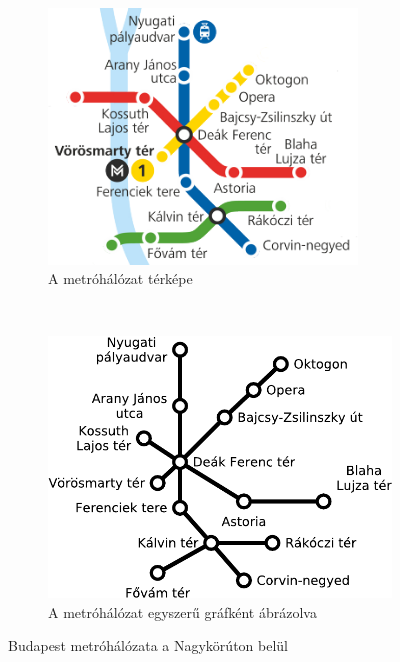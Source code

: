\begin{figure}[H]
	\begin{subfigure}[b]{0.5\textwidth}
		\centering
		\includegraphics[width=0.9\textwidth]{metrohalozat-nagykorut-terkep}
		\caption{A metróhálózat térképe~\cite{BKK:metro}}
		\label{fig:metrohalozat-nagykorut-terkep}
	\end{subfigure}
	~
	\begin{subfigure}[b]{0.5\textwidth}
		\includegraphics[width=\textwidth]{metrohalozat-nagykorut-egyszeru}
		\caption{A metróhálózat egyszerű gráfként ábrázolva}
		\label{fig:metrohalozat-nagykorut-egyszeru}
	\end{subfigure}
	\caption{Budapest metróhálózata a Nagykörúton belül}\label{fig:animals}
\end{figure}

